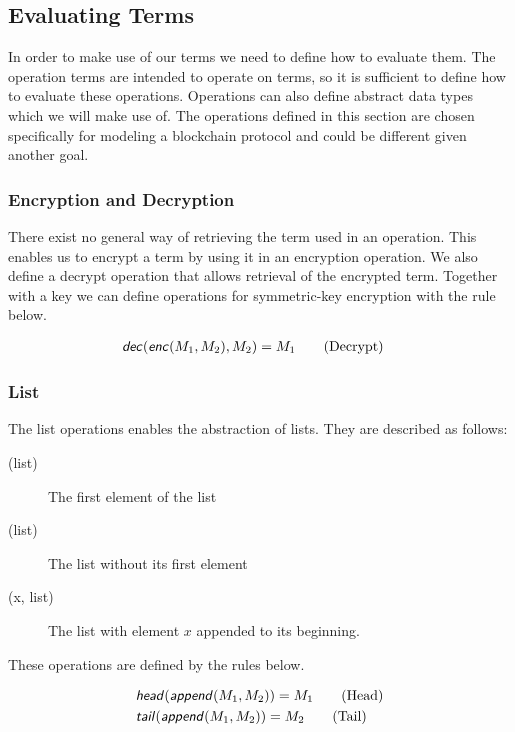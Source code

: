 \subsection{Evaluating Terms}
In order to make use of our terms we need to define how to evaluate them.
The operation terms are intended to operate on terms, so it is sufficient to define how to evaluate these operations.
Operations can also define abstract data types which we will make use of.
The operations defined in this section are chosen specifically for modeling a blockchain protocol and could be different given another goal.



\subsubsection{Encryption and Decryption}
There exist no general way of retrieving the term used in an operation.
This enables us to encrypt a term by using it in an encryption operation.
We also define a decrypt operation that allows retrieval of the encrypted term.
Together with a key we can define operations for symmetric-key encryption with the rule below.

\begin{align*}
    &\text{\sffamily \textit{dec}\normalfont}(\text{\sffamily \textit{enc}\normalfont}(M_1, M_2),M_2) = M_1 \tag{Decrypt}
\end{align*}

\FloatBarrier

\subsubsection{List}
The list operations enables the abstraction of lists.
They are described as follows:

\begin{description}
    \item[(list)] The first element of the list
    \item[(list)] The list without its first element
    \item[(x, list)] The list with element $x$ appended to its beginning.
\end{description}

These operations are defined by the rules below.

\begin{align*}
    &\text{\sffamily \textit{head}\normalfont}(\text{\sffamily \textit{append}\normalfont}(M_1, M_2)) = M_1 \tag{Head} \\
        &\text{\sffamily \textit{tail}\normalfont}(\text{\sffamily \textit{append}\normalfont}(M_1, M_2)) = M_2 \tag{Tail}
\end{align*}

